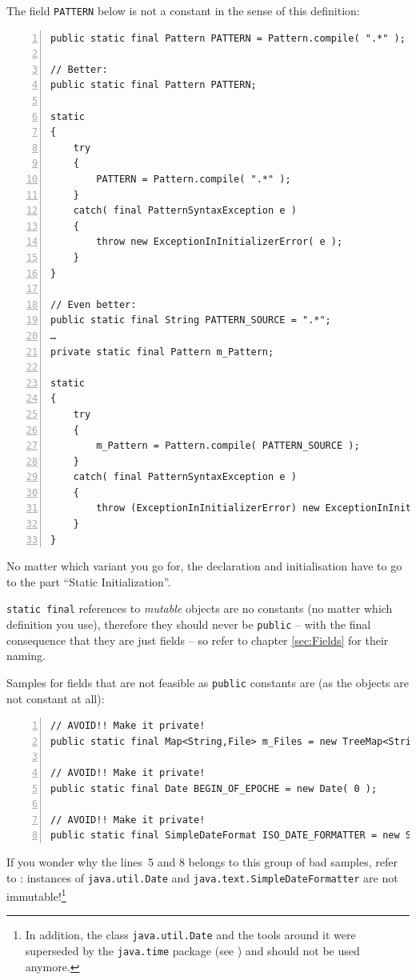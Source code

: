 \documentclass[11pt,a4paper, titlepage, parskip=half, headsepline, footsepline, cleardoublepage=current, headheight=1cm]{scrbook}
\newcommand*{\tqref}[1]{\hyperref[{#1}]{\ref*{#1}}}
\begin{document}
The field \lstinline|PATTERN| below is not a constant in the sense of this definition:
\begin{lstlisting}[numbers=left]
public static final Pattern PATTERN = Pattern.compile( ".*" );

// Better:
public static final Pattern PATTERN;

static
{
    try
    {
        PATTERN = Pattern.compile( ".*" );
    }
    catch( final PatternSyntaxException e )
    {
        throw new ExceptionInInitializerError( e );
    }    
}

// Even better:
public static final String PATTERN_SOURCE = ".*";
…
private static final Pattern m_Pattern;

static
{
    try
    {
        m_Pattern = Pattern.compile( PATTERN_SOURCE );
    }
    catch( final PatternSyntaxException e )
    {
        throw (ExceptionInInitializerError) new ExceptionInInitializerError( "Compilation of '%s' failed".formatted( PATTERN_SOURCE ).initCause( e );
    }    
}
\end{lstlisting}
No matter which variant you go for, the declaration and initialisation have to go to the part “Static Initialization”.

\lstinline|static final| references to \textit{mutable} objects are no constants (no matter which definition you use), therefore they should never be \lstinline|public| – with the final consequence that they are just fields – so refer to chapter \tqref{sec:Fields} for their naming.

Samples for fields that are not feasible as \lstinline|public| constants are (as the objects are not constant at all):
\begin{lstlisting}[numbers=left]
// AVOID!! Make it private!
public static final Map<String,File> m_Files = new TreeMap<String,File>();

// AVOID!! Make it private!
public static final Date BEGIN_OF_EPOCHE = new Date( 0 );

// AVOID!! Make it private!
public static final SimpleDateFormat ISO_DATE_FORMATTER = new SimpleDateFormat( ISO_DATE_FORMAT );
\end{lstlisting}

If you wonder why the lines~5 and 8 belongs to this group of bad samples, refer to \autocite{ORACLE_DOC_DATE_CLASS,ORACLE_DOC_SIMPLEDATEFORMATTER_CLASS}: instances of \lstinline|java.util.Date| and \lstinline|java.text.SimpleDateFormatter| are not immutable!\footnote{In addition, the class \lstinline|java.util.Date| and the tools around it were superseded by the \lstinline|java.time| package (see \autocite{ORACLE_DOC_TIME_PACKAGE}) and should not be used anymore.}
\end{document}
